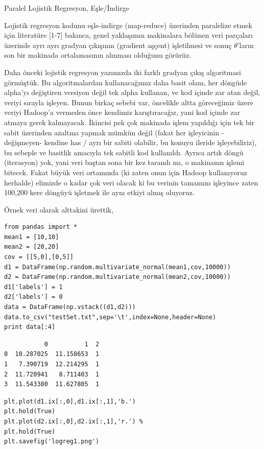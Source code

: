 \documentclass[12pt,fleqn]{article}\usepackage{../../common}
\begin{document}
Paralel Lojistik Regresyon, Eşle/İndirge

Lojistik regresyon kodunu eşle-indirge (map-reduce) üzerinden paralelize
etmek için literatüre [1-7] bakınca, genel yaklaşımın makinalara bölünen
veri parçaları üzerinde ayrı ayrı gradyan çıkışının (gradient aşçent)
işletilmesi ve sonuç $\theta$'ların son bir makinada ortalamasının alınması
olduğunu görürüz.

Daha önceki lojistik regresyon yazımızda iki farklı gradyan çıkış
algoritmasi görmüştük. Bu algoritmalardan kullanacağımız daha basit olanı,
her döngüde alpha'yı değiştiren versiyon değil tek alpha kullanan, ve kod
içinde zar atan değil, veriyi sırayla işleyen. Bunun birkaç sebebi var,
öncelikle altta göreceğimiz üzere veriyi Hadoop'a vermeden önce kendimiz
karıştıracağız, yani kod içinde zar atmaya gerek kalmayacak. İkincisi pek
çok makinada işlem yapıldığı için tek bir sabit üzerinden azaltma yapmak
mümkün değil (fakat her işleyicinin -değişmeyen- kendine has / ayrı bir
sabiti olabilir, bu konuyu ileride işleyebiliriz), bu sebeple ve basitlik
amacıyla tek sabitli kod kullanıldı. Ayrıca artık döngü (iterasyon) yok,
yani veri baştan sona bir kez tarandı mı, o makinanın işlemi bitecek. Fakat
büyük veri ortamında (ki zaten onun için Hadoop kullanıyoruz herhalde)
elimizde o kadar çok veri olacak ki bu verinin tamamını işleyince zaten
100,200 kere döngüyü işletmek ile aynı etkiyi almış oluyoruz.

Örnek veri olarak alttakini ürettik,

\begin{verbatim}
from pandas import *
mean1 = [10,10]
mean2 = [20,20]
cov = [[5,0],[0,5]]             
d1 = DataFrame(np.random.multivariate_normal(mean1,cov,10000))
d2 = DataFrame(np.random.multivariate_normal(mean2,cov,10000))
d1['labels'] = 1
d2['labels'] = 0
data = DataFrame(np.vstack((d1,d2)))
data.to_csv("testSet.txt",sep='\t',index=None,header=None)
print data[:4]
\end{verbatim}

\begin{verbatim}
           0          1  2
0  10.287025  11.158653  1
1   7.390719  12.214295  1
2  11.720941   8.711403  1
3  11.543380  11.627805  1
\end{verbatim}

\begin{verbatim}
plt.plot(d1.ix[:,0],d1.ix[:,1],'b.')
plt.hold(True)
plt.plot(d2.ix[:,0],d2.ix[:,1],'r.') %
plt.hold(True)
plt.savefig('logreg1.png')
\end{verbatim}
\end{document}
